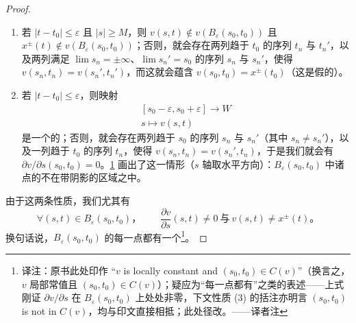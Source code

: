 \begin{proof}
\begin{enumerate}[label=(\arabic*)]
\item 若 $|t-t_0|\le\varepsilon$ 且 $|s|\ge M$，则 $v(s,t)\notin v(B_\varepsilon(s_0,t_0))$ 且 $x^\pm(t)\notin v(B_\varepsilon(s_0,t_0))$；否则，就会存在两列趋于 $t_0$ 的序列 $t_n$ 与 $t_n'$，以及两列满足 $\lim s_n=\pm\infty$、$\lim s_n'=s_0$ 的序列 $s_n$ 与 $s_n'$，使得 $v(s_n,t_n)=v(s_n',t_n')$，而这就会蕴含 $v(s_0,t_0)=x^\pm(t_0)$（这是假的）。
\item 若 $|t-t_0|\le\varepsilon$，则映射
\[
\begin{array}{c}
{[s_0-\varepsilon,s_0+\varepsilon]\longrightarrow W}\\
s\longmapsto v(s,t)
\end{array}
\]
是一个\trInjective{}的\trImmersion；否则，就会存在两列趋于 $s_0$ 的序列 $s_n$ 与 $s_n'$（其中 $s_n\neq s_n'$），以及一列趋于 $t_0$ 的序列 $t_n$，使得 $v(s_n,t_n)=v(s_n',t_n)$，于是我们就会有 $\partial v/\partial s(s_0,t_0)=0$。\cref{fig:strip-balls} 画出了这一情形（$s$ 轴取水平方向）：$B_\varepsilon(s_0,t_0)$ 中诸点的\trMultiplePoint{}不在带阴影的区域之中。
\end{enumerate}

\begin{figure}[htbp]
\centering
{}
\caption{}
\label{fig:strip-balls}
\end{figure}

由于这两条性质，我们尤其有
\[
\forall(s,t)\in B_\varepsilon(s_0,t_0)\text{，}\qquad
\frac{\partial v}{\partial s}(s,t)\neq 0
\ \text{与}\
v(s,t)\neq x^\pm(t)\text{。}
\]
换句话说，$B_\varepsilon(s_0,t_0)$ 的每一点都有一个\trMultiplePoint\footnote{译注：原书此处印作 “$v$ is locally constant and $(s_0,t_0)\in C(v)$”（换言之，$v$ 局部常值且 $(s_0,t_0)\in C(v)$）；疑应为“每一点都有\trMultiplePoint”之类的表述——上式刚证 $\partial v/\partial s$ 在 $B_\varepsilon(s_0,t_0)$ 上处处非零，下文性质 (3) 的括注亦明言 $(s_0,t_0)$ is not in $C(v)$，均与印文直接相抵；此处径改。——译者注}。


\end{proof}
